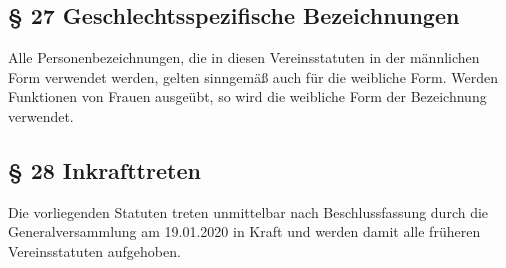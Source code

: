 \documentclass[11pt,a4paper]{article}
\begin{document}
\subsection{§ 27
Geschlechtsspezifische Bezeichnungen}

Alle Personenbezeichnungen, die in diesen Vereinsstatuten in der männlichen Form verwendet werden, gelten sinngemäß auch für die weibliche Form.
Werden Funktionen von Frauen ausgeübt, so wird die weibliche Form der Bezeichnung verwendet.

\subsection{§ 28
Inkrafttreten}

Die vorliegenden Statuten treten unmittelbar nach Beschlussfassung durch die Generalversammlung am 19.01.2020 in Kraft und werden damit alle früheren Vereinsstatuten aufgehoben.
\end{document}
